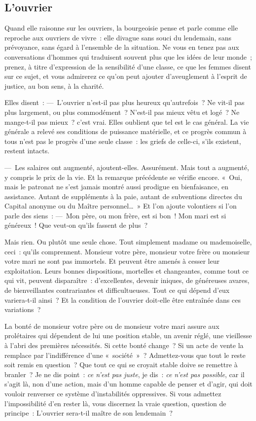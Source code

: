 \documentclass[french,twoside]{book} %
\begin{document}
\subsection[L’ouvrier]{L’ouvrier}
\noindent Quand elle raisonne sur les ouvriers, la bourgeoisie pense et parle comme elle reproche aux ouvriers de vivre : elle divague sans souci du lendemain, sans prévoyance, sans égard à l’ensemble de la situation. Ne vous en tenez pas aux conversations d’hommes qui traduisent souvent plus que les idées de leur monde ; prenez, à titre d’expression de la sensibilité d’une classe, ce que les femmes disent sur ce sujet, et vous admirerez ce qu’on peut ajouter d’aveuglement à l’esprit de justice, au bon sens, à la charité.\par
Elles disent : — L’ouvrier n’est-il pas plus heureux qu’autrefois ? Ne vit-il pas plus largement, ou plus commodément ? N’est-il pas mieux vêtu et logé ? Ne mange-t-il pas mieux ? c’est vrai. Elles oublient que tel est le cas général. La vie générale a relevé ses conditions de puissance matérielle, et ce progrès commun à tous n’est pas le progrès d’une seule classe : les griefs de celle-ci, s’ils existent, restent intacts.\par
— Les salaires ont augmenté, ajoutent-elles. Assurément. Mais tout a augmenté, y compris le prix de la vie. Et la remarque précédente se vérifie encore. « Oui, mais le patronat ne s’est jamais montré aussi prodigue en bienfaisance, en assistance. Autant de suppléments à la paie, autant de subventions directes du Capital anonyme ou du Maître personnel… » Et l’on ajoute volontiers si l’on parle des siens : — Mon père, ou mon frère, est si bon ! Mon mari est si généreux ! Que veut-on qu’ils fassent de plus ?\par
Mais rien. Ou plutôt une seule chose. Tout simplement madame ou mademoiselle, ceci : qu’ils comprennent. Monsieur votre père, monsieur votre frère ou monsieur votre mari ne sont pas immortels. Et peuvent être amenés à cesser leur exploitation. Leurs bonnes dispositions, mortelles et changeantes, comme tout ce qui vit, peuvent disparaître : d’excellentes, devenir iniques, de généreuses avares, de bienveillantes contrariantes et difficultueuses. Tout ce qui dépend d’eux variera-t-il ainsi ? Et la condition de l’ouvrier doit-elle être entraînée dans ces variations ?\par
La bonté de monsieur votre père ou de monsieur votre mari assure aux prolétaires qui dépendent de lui une position stable, un avenir réglé, une vieillesse à l’abri des premières nécessités. Si cette bonté change ? Si un acte de vente la remplace par l’indifférence d’une « société » ? Admettez-vous que tout le reste soit remis en question ? Que tout ce qui se croyait stable doive se remettre à branler ? Je ne dis point : \emph{ce n’est pas juste}, je dis : \emph{ce n’est pas possible}, car il s’agit là, non d’une action, mais d’un homme capable de penser et d’agir, qui doit vouloir renverser ce système d’instabilités oppressives. Si vous admettez l’impossibilité d’en rester là, vous discernez la vraie question, question de principe : L’ouvrier sera-t-il maître de son lendemain ?\par
\end{document}
